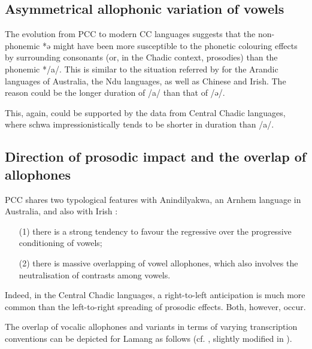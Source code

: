 \documentclass[output=paper]{langscibook}
\begin{document}
\subsection{Asymmetrical allophonic variation of vowels}
\label{sec:Wolff:3.3}

The evolution from PCC to modern CC languages suggests that the non-phonemic *ə might have been more susceptible to the phonetic colouring effects by surrounding consonants (or, in the Chadic context, prosodies) than the phonemic */a/. This is similar to the situation referred by \citet[76, 106]{Anderson2016} for the Arandic languages of Australia, the Ndu languages, as well as Chinese and Irish. The reason could be the longer duration of /a/ than that of /ə/.

This, again, could be supported by the data from Central Chadic languages, where schwa impressionistically tends to be shorter in duration than /a/.

\subsection{Direction of prosodic impact and the overlap of allophones}
\label{sec:Wolff:3.4}

PCC shares two typological features with Anindilyakwa, an Arnhem language in Australia, and also with Irish \citep{Anderson2016}: 

\begin{itemize}
  \item[(1)] there is a strong tendency to favour the regressive over the progressive conditioning of vowels;
  \item[(2)] there is massive overlapping of vowel allophones, which also involves the neutralisation of contrasts among vowels.
\end{itemize}

Indeed, in the Central Chadic languages, a right-to-left anticipation is much more common than the left-to-right spreading of prosodic effects. Both, however, occur.

The overlap of vocalic allophones and variants in terms of varying transcription conventions can be depicted for Lamang as follows (cf. \cites[37]{Wolff1983b}[17]{Wolff2017}, slightly modified in ).
\end{document}
